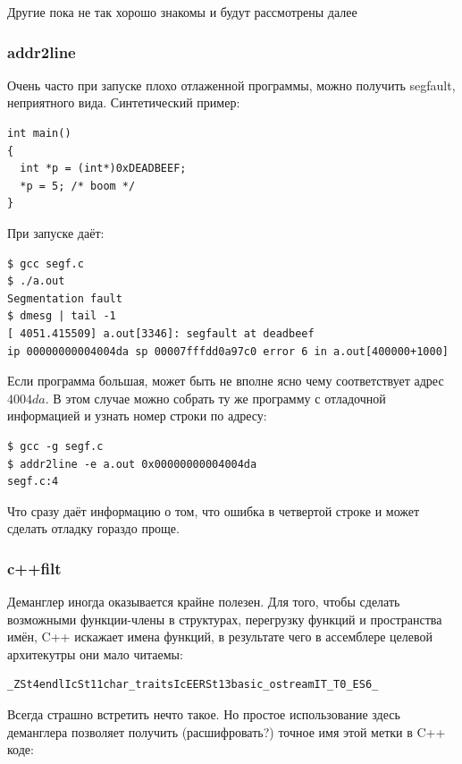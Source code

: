 \documentclass[a4paper,12pt,oneside]{article}
\begin{document}
Другие пока не так хорошо знакомы и будут рассмотрены далее 

\subsubsection{addr2line}\label{subsubsec:AddrLine}

Очень часто при запуске плохо отлаженной программы, можно получить segfault, неприятного вида. Синтетический пример:

\begin{lstlisting}
int main()
{
  int *p = (int*)0xDEADBEEF;
  *p = 5; /* boom */
}
\end{lstlisting}

При запуске даёт:

\begin{verbatim}
$ gcc segf.c
$ ./a.out 
Segmentation fault
$ dmesg | tail -1
[ 4051.415509] a.out[3346]: segfault at deadbeef 
ip 00000000004004da sp 00007fffdd0a97c0 error 6 in a.out[400000+1000]
\end{verbatim}

Если программа большая, может быть не вполне ясно чему соответствует адрес $4004da$. В этом случае можно собрать ту же программу с отладочной информацией и узнать номер строки по адресу:

\begin{verbatim}
$ gcc -g segf.c
$ addr2line -e a.out 0x00000000004004da
segf.c:4
\end{verbatim}

Что сразу даёт информацию о том, что ошибка в четвертой строке и может сделать отладку гораздо проще.

\subsubsection{c++filt}\label{subsubsec:Demangle}

Деманглер иногда оказывается крайне полезен. Для того, чтобы сделать возможными функции-члены в структурах, перегрузку функций и пространства имён, C++ искажает имена функций, в результате чего в ассемблере целевой архитекутры они мало читаемы:

\begin{verbatim}
_ZSt4endlIcSt11char_traitsIcEERSt13basic_ostreamIT_T0_ES6_
\end{verbatim}

Всегда страшно встретить нечто такое. Но простое использование здесь деманглера позволяет получить (расшифровать?) точное имя этой метки в C++ коде:
\end{document}
